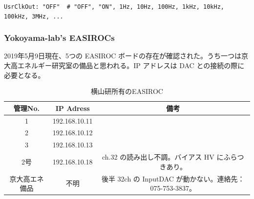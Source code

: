 \begin{shadebox}
\begin{verbatim}
UsrClkOut: "OFF"  # "OFF", "ON", 1Hz, 10Hz, 100Hz, 1kHz, 10kHz, 100kHz, 3MHz, ...
\end{verbatim}
\end{shadebox}


\newpage
\subsubsection{Yokoyama-lab's EASIROCs}
2019年5月9日現在、5つの EASIROC ボードの存在が確認された。うち一つは京大高エネルギー研究室の備品と思われる。IP アドレスは DAC との接続の際に必要となる。
\begin{table}[H]
\begin{center}
\caption{横山研所有のEASIROC}
\begin{tabular}{ccc} \hline
管理No. & IP Adress & 備考 \\ \hline
1 & 192.168.10.11 &  \\ 
2 & 192.168.10.12 &  \\ 
3 & 192.168.10.13 &  \\ 
2号 & 192.168.10.18 & ch.32 の読み出し不調。バイアス HV にふらつきあり。 \\ 
京大高エネ備品 & 不明 & 後半 32ch の InputDAC が動かない。連絡先：075-753-3837。  \\ \hline
\end{tabular}
\end{center}
\end{table}
